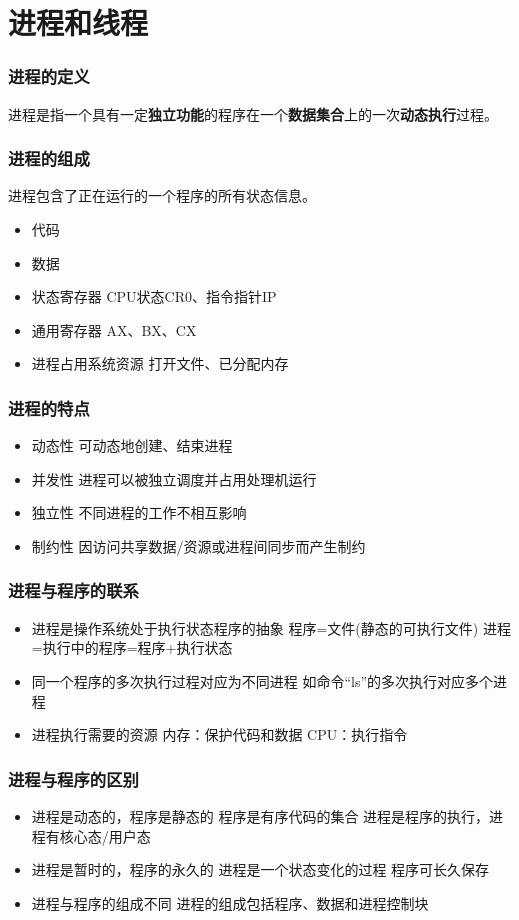 \chapter{进程和线程}
\subsection{进程的定义}
进程是指一个具有一定\textbf{独立功能}的程序在一个\textbf{数据集合}上的一次\textbf{动态执行}过程。
\subsection{进程的组成}
进程包含了正在运行的一个程序的所有状态信息。
\begin{itemize}
	\item 代码
	\item 数据
	\item 状态寄存器
	\subitem CPU状态CR0、指令指针IP
	\item 通用寄存器
	\subitem AX、BX、CX
	\item 进程占用系统资源
	\subitem 打开文件、已分配内存
\end{itemize}
\subsection{进程的特点}
\begin{itemize}
	\item 动态性
	\subitem 可动态地创建、结束进程
	\item 并发性
	\subitem 进程可以被独立调度并占用处理机运行
	\item 独立性
	\subitem 不同进程的工作不相互影响
	\item 制约性
	\subitem 因访问共享数据/资源或进程间同步而产生制约
\end{itemize}
\subsection{进程与程序的联系}
\begin{itemize}
	\item 进程是操作系统处于执行状态程序的抽象
	\subitem 程序=文件(静态的可执行文件)
	\subitem 进程=执行中的程序=程序+执行状态
	\item 同一个程序的多次执行过程对应为不同进程
	\subitem 如命令“ls”的多次执行对应多个进程
	\item 进程执行需要的资源
	\subitem 内存：保护代码和数据
	\subitem CPU：执行指令
\end{itemize}
\subsection{进程与程序的区别}
\begin{itemize}
	\item 进程是动态的，程序是静态的
	\subitem 程序是有序代码的集合
	\subitem 进程是程序的执行，进程有核心态/用户态
	\item 进程是暂时的，程序的永久的
	\subitem 进程是一个状态变化的过程
	\subitem 程序可长久保存
	\item 进程与程序的组成不同
	\subitem 进程的组成包括程序、数据和进程控制块
\end{itemize}